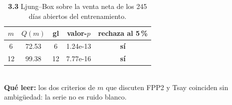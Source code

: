 \begin{table}[htbp]
\centering
\footnotesize
\caption{\textbf{3.3} Ljung--Box sobre la venta neta de los 245 d\'ias abiertos del entrenamiento.}
\label{tab:p3_ljungbox}
\begin{tabular}{ccccc}
\toprule
\textbf{$m$} & \textbf{$Q(m)$} & \textbf{gl} & \textbf{valor-$p$} & \textbf{rechaza al 5\,\%} \\
\midrule
6 & 72.53 & 6 & 1.24e-13 & \textbf{s\'i} \\
12 & 99.38 & 12 & 7.77e-16 & \textbf{s\'i} \\
\bottomrule
\end{tabular}
\\[0.3em]{\scriptsize \textbf{Qu\'e leer:} los dos criterios de $m$ que discuten FPP2 y Tsay coinciden sin ambig\"uedad: la serie no es ruido blanco.}
\end{table}
